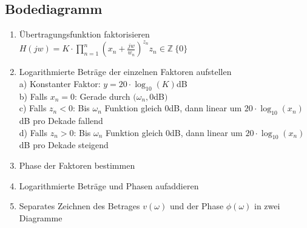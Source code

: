 \documentclass[fs, footer]{latex4ei}
\begin{document}
\begin{multicols*}{4}
    \subsection{Bodediagramm}
    \begin{enumerate}
        \item Übertragungsfunktion faktorisieren\\
              $H(jw) = K \cdot \prod_{n=1}^n \left(x_n+\frac{jw}{w_n}\right)^{z_n}$\qquad$z_n \in \mathbb{Z} \ \{0\}$\\
        \item Logarithmierte Beträge der einzelnen Faktoren aufstellen\\
              \quad a) Konstanter Faktor: $y = 20\cdot\log_{10}(K)$dB\\
              \quad b) Falls $x_n = 0$: Gerade durch $(\omega_n, 0$dB$)$\\
              \quad c) Falls $z_n < 0$: Bis $\omega_n$ Funktion gleich 0dB, dann linear um $20 \cdot\log_{10}(x_n)$dB pro Dekade fallend\\
              \quad d) Falls $z_n > 0$: Bis $\omega_n$ Funktion gleich 0dB, dann linear um $20 \cdot\log_{10}(x_n)$dB pro Dekade steigend\\
        \item Phase der Faktoren bestimmen
        \item Logarithmierte Beträge und Phasen aufaddieren
        \item Separates Zeichnen des Betrages $v(\omega)$ und der Phase $\phi(\omega)$ in zwei Diagramme
    \end{enumerate}

\end{multicols*}
\end{document}

